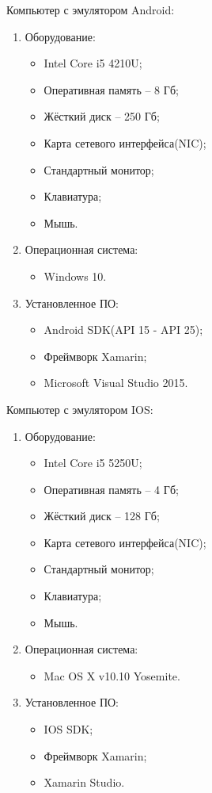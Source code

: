 Компьютер с эмулятором Android:
\begin{enumerate}
	\item Оборудование:
	\begin{itemize}
		\item Intel Core i5 4210U;
		\item Оперативная память – 8 Гб;
		\item Жёсткий диск – 250 Гб;
		\item Карта сетевого интерфейса(NIC);
		\item Стандартный монитор;
		\item Клавиатура;
		\item Мышь.
	\end{itemize}
	\item Операционная система:
	\begin{itemize}
		\item Windows 10.
	\end{itemize}
	\item Установленное ПО:
	\begin{itemize}
		\item Android SDK(API 15 - API 25);
		\item Фреймворк Xamarin;
		\item Microsoft Visual Studio 2015.
	\end{itemize}
\end{enumerate}
Компьютер с эмулятором IOS:
\begin{enumerate}
	\item Оборудование:
\begin{itemize}
	\item Intel Core i5 5250U;
	\item Оперативная память – 4 Гб;
	\item Жёсткий диск – 128 Гб;
	\item Карта сетевого интерфейса(NIC);
	\item Стандартный монитор;
	\item Клавиатура;
	\item Мышь.
\end{itemize}
\item Операционная система:
\begin{itemize}
	\item Mac OS X v10.10 Yosemite.
\end{itemize}
\item Установленное ПО:
\begin{itemize}
	\item IOS SDK;
	\item Фреймворк Xamarin;
	\item Xamarin Studio.
\end{itemize}
\end{enumerate}
